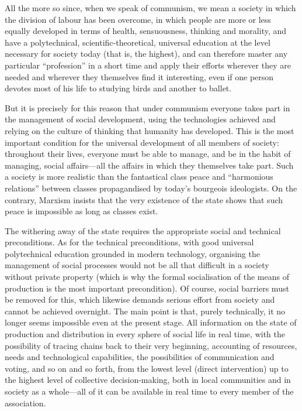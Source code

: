 \documentclass[../main]{subfiles}
\begin{document}
All the more so since, when we speak of communism, we mean a society in which the division of labour has been overcome, in which people are more or less equally developed in terms of health, sensuousness, thinking and morality, and have a polytechnical, scientific-theoretical, universal education at the level necessary for society today (that is, the highest), and can therefore master any particular “profession” in a short time and apply their efforts wherever they are needed and wherever they themselves find it interesting, even if one person devotes most of his life to studying birds and another to ballet.

But it is precisely for this reason that under communism everyone takes part in the management of social development, using the technologies achieved and relying on the culture of thinking that humanity has developed. This is the most important condition for the universal development of all members of society: throughout their lives, everyone must be able to manage, and be in the habit of managing, social affairs—all the affairs in which they themselves take part. Such a society is more realistic than the fantastical class peace and “harmonious relations” between classes propagandised by today’s bourgeois ideologists. On the contrary, Marxism insists that the very existence of the state shows that such peace is impossible as long as classes exist.

The withering away of the state requires the appropriate social and technical preconditions. As for the technical preconditions, with good universal polytechnical education grounded in modern technology, organising the management of social processes would not be all that difficult in a society without private property (which is why the formal socialisation of the means of production is the most important precondition). Of course, social barriers must be removed for this, which likewise demands serious effort from society and cannot be achieved overnight. The main point is that, purely technically, it no longer seems impossible even at the present stage. All information on the state of production and distribution in every sphere of social life in real time, with the possibility of tracing chains back to their very beginning, accounting of resources, needs and technological capabilities, the possibilities of communication and voting, and so on and so forth, from the lowest level (direct intervention) up to the highest level of collective decision-making, both in local communities and in society as a whole—all of it can be available in real time to every member of the association.
\end{document}
